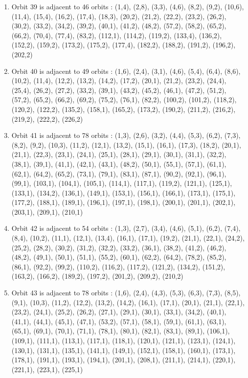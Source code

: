 \documentclass[12pt]{article}
\begin{document}
\begin{enumerate}
\item Orbit 39 is adjacent to 46 orbits : (1,4), (2,8), (3,3), (4,6), (8,2), (9,2), (10,6), (11,4), (15,4), (16,2), (17,4), (18,3), (20,2), (21,2), (22,2), (23,2), (26,2), (30,2), (33,2), (34,2), (39,2), (40,1), (41,2), (48,2), (57,2), (58,2), (65,2), (66,2), (70,4), (77,4), (83,2), (112,1), (114,2), (119,2), (133,4), (136,2), (152,2), (159,2), (173,2), (175,2), (177,4), (182,2), (188,2), (191,2), (196,2), (202,2)
\item Orbit 40 is adjacent to 49 orbits : (1,6), (2,4), (3,1), (4,6), (5,4), (6,4), (8,6), (10,2), (11,4), (12,2), (13,2), (14,2), (17,2), (20,1), (21,2), (23,2), (24,4), (25,4), (26,2), (27,2), (33,2), (39,1), (43,2), (45,2), (46,1), (47,2), (51,2), (57,2), (65,2), (66,2), (69,2), (75,2), (76,1), (82,2), (100,2), (101,2), (118,2), (120,2), (122,2), (135,2), (158,1), (165,2), (173,2), (190,2), (211,2), (216,2), (219,2), (222,2), (226,2)
\item Orbit 41 is adjacent to 78 orbits : (1,3), (2,6), (3,2), (4,4), (5,3), (6,2), (7,3), (8,2), (9,2), (10,3), (11,2), (12,1), (13,2), (15,1), (16,1), (17,3), (18,2), (20,1), (21,1), (22,3), (23,1), (24,1), (25,1), (28,1), (29,1), (30,1), (31,1), (32,2), (38,1), (39,1), (41,1), (42,1), (43,1), (48,2), (50,1), (55,1), (57,1), (61,1), (62,1), (64,2), (65,2), (73,1), (79,1), (83,1), (87,1), (90,2), (92,1), (96,1), (99,1), (103,1), (104,1), (105,1), (114,1), (117,1), (119,2), (121,1), (125,1), (133,1), (134,2), (136,1), (149,1), (153,1), (156,1), (166,1), (173,1), (175,1), (177,2), (188,1), (189,1), (196,1), (197,1), (198,1), (200,1), (201,1), (202,1), (203,1), (209,1), (210,1)
\item Orbit 42 is adjacent to 54 orbits : (1,3), (2,7), (3,4), (4,6), (5,1), (6,2), (7,4), (8,4), (10,2), (11,1), (12,1), (13,4), (16,1), (17,1), (19,2), (21,1), (22,1), (24,2), (25,2), (28,2), (30,2), (31,2), (32,2), (33,2), (36,1), (38,2), (41,2), (46,2), (48,2), (49,1), (50,1), (51,1), (55,2), (60,1), (62,2), (64,2), (78,2), (85,2), (86,1), (92,2), (99,2), (110,2), (116,2), (117,2), (121,2), (134,2), (151,2), (163,2), (166,2), (189,2), (197,2), (201,2), (209,2), (210,2)
\item Orbit 43 is adjacent to 78 orbits : (1,6), (2,4), (4,3), (5,3), (6,3), (7,3), (8,5), (9,1), (10,3), (11,2), (12,2), (13,2), (14,2), (16,1), (17,1), (20,1), (21,1), (22,1), (23,2), (24,1), (25,2), (26,2), (27,1), (29,1), (30,1), (33,1), (34,2), (40,1), (41,1), (44,1), (45,1), (47,1), (53,2), (57,1), (58,1), (59,1), (61,1), (63,1), (65,1), (69,1), (70,1), (71,1), (78,1), (80,1), (82,1), (83,1), (89,1), (106,1), (109,1), (111,1), (113,1), (117,1), (118,1), (120,1), (121,1), (123,1), (124,1), (130,1), (131,1), (135,1), (141,1), (149,1), (152,1), (158,1), (160,1), (173,1), (178,1), (191,1), (193,1), (194,1), (201,1), (208,1), (211,1), (214,1), (220,1), (221,1), (223,1), (225,1)

\end{enumerate}
\end{document}
